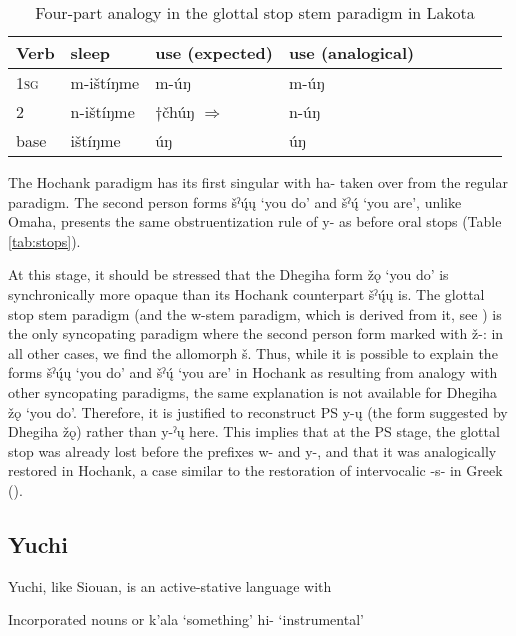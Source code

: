 \documentclass[oneside,a4paper,11pt]{article}
\newcommand{\ipa}[1]{{\phon#1}} %
\begin{document}
\begin{table}[H]
\caption{Four-part analogy in the glottal stop stem paradigm in Lakota} \label{tab:analogy.glottal} \centering
\begin{tabular}{lllllllll}
\toprule
Verb & sleep & use (expected) & use (analogical) \\
\midrule
\textsc{1sg} &\ipa{m-ištíŋme} &\ipa{m-úŋ} &\ipa{m-úŋ} &\\
2 & 	\ipa{n-ištíŋme}&$\dagger$\ipa{čhúŋ} $\Rightarrow$ &\ipa{n-úŋ} &  \\ 
base & \ipa{ištíŋme}	 &\ipa{úŋ} &\ipa{úŋ} & 	\\
\bottomrule
\end{tabular}
\end{table}

The Hochank paradigm has its first singular with \ipa{ha-} taken over from the regular paradigm. The second person forms \ipa{šˀų́ų} `you do' and \ipa{šˀų́} `you are', unlike Omaha, presents the same obstruentization rule of \ipa{*y-} as before oral stops (Table \ref{tab:stops}).

At this stage, it should be stressed that the Dhegiha form \ipa{žǫ} `you do' is synchronically more opaque than its Hochank counterpart \ipa{šˀų́ų} is. The glottal stop stem paradigm (and the w-stem paradigm, which is derived from it, see \citealt[496]{rankin05quapaw}) is the only syncopating paradigm where the second person form marked with \ipa{ž-}: in all other cases, we find the allomorph \ipa{š}. Thus, while it is possible to explain the forms \ipa{šˀų́ų} `you do' and \ipa{šˀų́} `you are' in Hochank as resulting from analogy with other syncopating paradigms, the same explanation is not available for Dhegiha \ipa{žǫ} `you do'. Therefore, it is justified to reconstruct PS \ipa{*y-ų} (the form suggested by Dhegiha \ipa{žǫ}) rather than \ipa{*y-ˀų} here. This implies that at the PS stage, the glottal stop was already lost before the prefixes \ipa{*w-} and \ipa{*y-}, and that it was analogically restored in Hochank, a case similar to the restoration of intervocalic -s- in Greek (\citealt{hill14conditioned}).

\subsection{Yuchi}
Yuchi, like Siouan, is an active-stative language with 


\citet[334]{wagner38yuchi}

Incorporated nouns or \ipa{k'ala} `something' \ipa{hi-} `instrumental'
\end{document}
